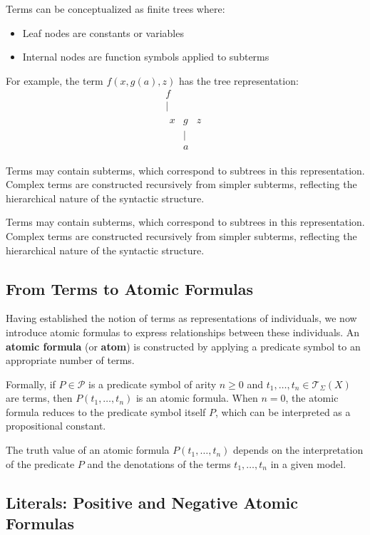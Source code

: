 \documentclass[11pt,a4paper]{article}
\theoremstyle{definition}
\theoremstyle{plain}
\theoremstyle{remark}
\begin{document}
Terms can be conceptualized as finite trees where:
\begin{itemize}
    \item Leaf nodes are constants or variables
    \item Internal nodes are function symbols applied to subterms
\end{itemize}

For example, the term $f(x, g(a), z)$ has the tree representation:
\[
\begin{array}{c}
  f \\
  | \\
  \begin{array}{ccc}
    x & g & z \\
       & | & \\
       & a &
  \end{array}
\end{array}
\]

Terms may contain subterms, which correspond to subtrees in this representation. Complex terms are constructed recursively from simpler subterms, reflecting the hierarchical nature of the syntactic structure.

Terms may contain subterms, which correspond to subtrees in this representation. Complex terms are constructed recursively from simpler subterms, reflecting the hierarchical nature of the syntactic structure.

\subsection{From Terms to Atomic Formulas}

Having established the notion of terms as representations of individuals, we now introduce atomic formulas to express relationships between these individuals. An \textbf{atomic formula} (or \textbf{atom}) is constructed by applying a predicate symbol to an appropriate number of terms.

Formally, if $P \in \mathcal{P}$ is a predicate symbol of arity $n \geq 0$ and $t_1, \dots, t_n \in \mathcal{T}_\Sigma(X)$ are terms, then $P(t_1, \dots, t_n)$ is an atomic formula. When $n = 0$, the atomic formula reduces to the predicate symbol itself $P$, which can be interpreted as a propositional constant.

The truth value of an atomic formula $P(t_1, \dots, t_n)$ depends on the interpretation of the predicate $P$ and the denotations of the terms $t_1, \dots, t_n$ in a given model.

\subsection{Literals: Positive and Negative Atomic Formulas}
\end{document}
